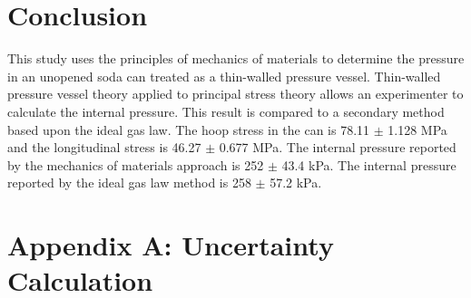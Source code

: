 \documentclass[10pt,journal,letterpaper]{IEEEtran}
\begin{document}
\section{Conclusion}

This study uses the principles of mechanics of materials to determine the pressure in an unopened soda can treated as a thin-walled pressure vessel.
Thin-walled pressure vessel theory applied to principal stress theory allows an experimenter to calculate the internal pressure.
This result is compared to a secondary method based upon the ideal gas law.
The hoop stress in the can is 78.11 $\pm$ 1.128 MPa and the longitudinal stress is 46.27 $\pm$ 0.677 MPa.
The internal pressure reported by the mechanics of materials approach is 252 $\pm$ 43.4 kPa. The internal pressure reported by the ideal gas law method is 258 $\pm$ 57.2 kPa.

\section*{Appendix A: Uncertainty Calculation}
\end{document}
